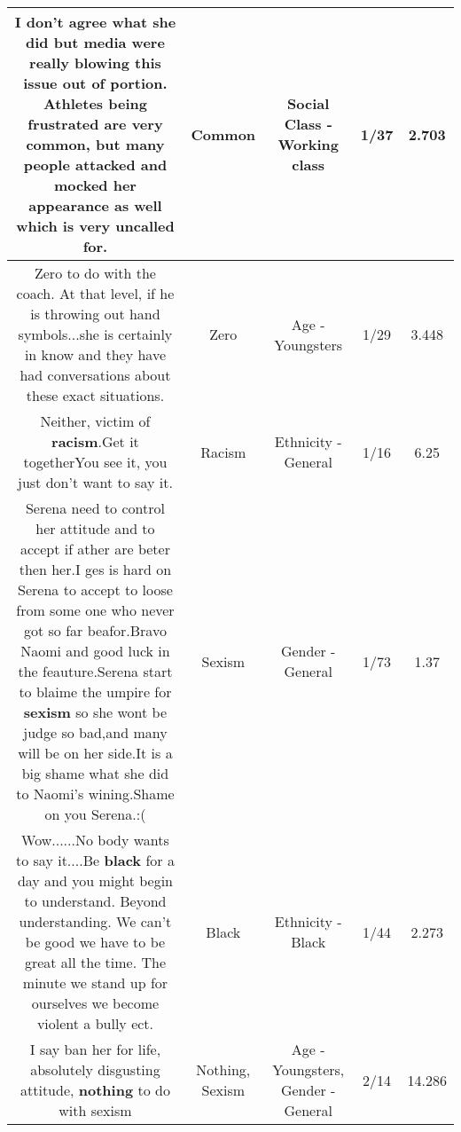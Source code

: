 \documentclass[11pt]{article}
\newlength\mylength
\begin{document}
\begin{center}
\begin{longtable}{|C{.65\mylength}|C{.30\mylength}|C{.12\mylength}|C{.12\mylength}|C{.12\mylength}|}
  \small I don't agree what she did but media were really blowing this issue out of portion. Athletes being frustrated are very \textbf{common}, but many people attacked and mocked her appearance as well which is very uncalled for.\normalsize   & Common & Social Class - Working class & 1/37 & 2.703 \\  \hline
  \small Zero to do with the coach. At that level, if he is throwing out hand symbols...she is certainly in know and they have had conversations about these exact situations.\normalsize   & Zero & Age - Youngsters & 1/29 & 3.448 \\  \hline
  \small Neither, victim of \textbf{racism}.Get it togetherYou see it, you just don't want to say it.\normalsize   & Racism & Ethnicity - General & 1/16 & 6.25 \\  \hline
  \small Serena need to control her attitude and to accept if ather are beter then her.I ges is hard on Serena to accept to loose from some one who never  got so far beafor.Bravo Naomi and good luck in the feauture.Serena start to blaime the umpire for \textbf{sexism} so she wont be judge so bad,and many will be on her side.It is a big shame what she did to Naomi's wining.Shame on you Serena.:(\normalsize   & Sexism & Gender - General & 1/73 & 1.37 \\  \hline
  \small Wow......No body wants to say it....Be \textbf{black} for a day and you might begin to understand. Beyond understanding. We can't be good we have to be great all the time. The minute we stand up for ourselves we become violent a bully  ect.\normalsize   & Black & Ethnicity - Black & 1/44 & 2.273 \\  \hline
  \small I say ban her for life, absolutely disgusting attitude, \textbf{nothing} to do with sexism\normalsize   & Nothing, Sexism & Age - Youngsters, Gender - General & 2/14 & 14.286 \\  \hline

\end{longtable}
\end{center}
\end{document}
